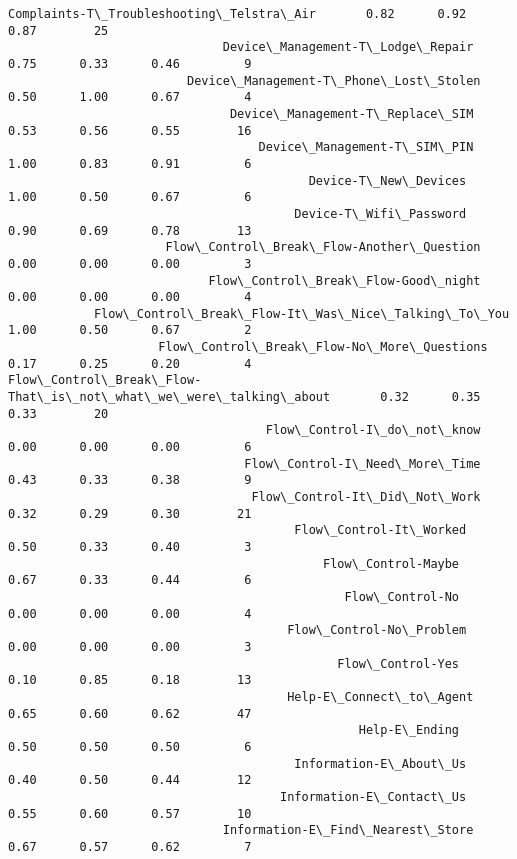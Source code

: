 \documentclass[11pt]{article}
\begin{document}
\begin{Verbatim}[commandchars=\\\{\}]
                      Complaints-T\_Troubleshooting\_Telstra\_Air       0.82      0.92      0.87        25
                              Device\_Management-T\_Lodge\_Repair       0.75      0.33      0.46         9
                         Device\_Management-T\_Phone\_Lost\_Stolen       0.50      1.00      0.67         4
                               Device\_Management-T\_Replace\_SIM       0.53      0.56      0.55        16
                                   Device\_Management-T\_SIM\_PIN       1.00      0.83      0.91         6
                                          Device-T\_New\_Devices       1.00      0.50      0.67         6
                                        Device-T\_Wifi\_Password       0.90      0.69      0.78        13
                      Flow\_Control\_Break\_Flow-Another\_Question       0.00      0.00      0.00         3
                            Flow\_Control\_Break\_Flow-Good\_night       0.00      0.00      0.00         4
            Flow\_Control\_Break\_Flow-It\_Was\_Nice\_Talking\_To\_You       1.00      0.50      0.67         2
                     Flow\_Control\_Break\_Flow-No\_More\_Questions       0.17      0.25      0.20         4
Flow\_Control\_Break\_Flow-That\_is\_not\_what\_we\_were\_talking\_about       0.32      0.35      0.33        20
                                    Flow\_Control-I\_do\_not\_know       0.00      0.00      0.00         6
                                 Flow\_Control-I\_Need\_More\_Time       0.43      0.33      0.38         9
                                  Flow\_Control-It\_Did\_Not\_Work       0.32      0.29      0.30        21
                                        Flow\_Control-It\_Worked       0.50      0.33      0.40         3
                                            Flow\_Control-Maybe       0.67      0.33      0.44         6
                                               Flow\_Control-No       0.00      0.00      0.00         4
                                       Flow\_Control-No\_Problem       0.00      0.00      0.00         3
                                              Flow\_Control-Yes       0.10      0.85      0.18        13
                                       Help-E\_Connect\_to\_Agent       0.65      0.60      0.62        47
                                                 Help-E\_Ending       0.50      0.50      0.50         6
                                        Information-E\_About\_Us       0.40      0.50      0.44        12
                                      Information-E\_Contact\_Us       0.55      0.60      0.57        10
                              Information-E\_Find\_Nearest\_Store       0.67      0.57      0.62         7

\end{Verbatim}
\end{document}
